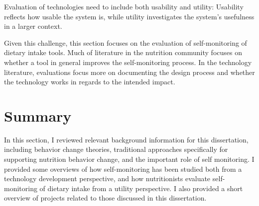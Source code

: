 Evaluation of technologies need to include both usability and utility: Usability reflects how usable the system is, while utility investigates the system's usefulness in a larger context.  

Given this challenge, this section focuses on the evaluation of self-monitoring of dietary intake tools. 
Much of literature in the nutrition community focuses on whether a tool in general improves the self-monitoring process. In the technology literature, evaluations focus more on documenting the design process and whether the technology works in regards to the intended impact. 






\section{Summary}In this section, I reviewed relevant background information for this dissertation, including behavior change theories, traditional approaches specifically for supporting nutrition behavior change, and the important role of  self monitoring. I provided some overviews of how self-monitoring has been studied both from a technology development perspective, and how nutritionists evaluate self-monitoring of dietary intake from a utility perspective. I also provided a short overview of projects related to those discussed in this dissertation. 
